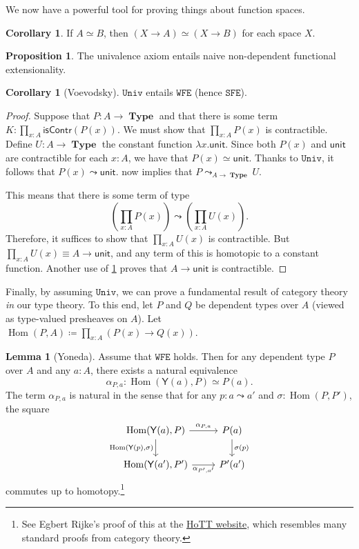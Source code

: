 \documentclass[10pt,letterpaper,cm]{nupset}
\theoremstyle{definition}
\theoremstyle{theorem}
\newtheorem{lemma}[definition]{Lemma}
\newtheorem{prop}[definition]{Proposition}
\newtheorem{corollary}[definition]{Corollary}
\theoremstyle{remark}
\newcommand{\1}{\mathbf{1}}
\newcommand{\wfe}{\mathtt{WFE}}
\newcommand{\sfe}{\mathtt{SFE}}
\newcommand{\univ}{\mathtt{Univ}}
\newcommand{\0}{\vec 0}
\DeclareMathOperator{\Hom}{Hom}
\DeclareMathOperator{\type}{\mathbf{Type}}
\begin{document}
We now have a powerful tool for proving things about function spaces.

\begin{corollary}
If $A \simeq B$, then $\left(X \to A\right) \simeq \left(X \to B\right)$ for each space $X$.
\end{corollary}

\begin{prop}\label{PP}
The univalence axiom entails naive non-dependent functional extensionality. 
\end{prop}

\begin{corollary}[Voevodsky]
$\univ$ entails $\wfe$ (hence $\sfe$).
\end{corollary}
\begin{proof}
Suppose that $P: A \to \type$ and that there is some term $K: \prod_{x:A}\mathsf{isContr}(P(x))$. We must show that $\prod_{x:A} P(x)$ is contractible.  Define $U: A \to \type$ the constant function $\lambda x. \mathsf{unit}$. Since both $P(x)$ and $ \mathsf{unit}$ are contractible for each $x:A$, we have that $P(x) \simeq  \mathsf{unit}$. Thanks to $\univ$, it follows that $P(x) \leadsto  \mathsf{unit}$.   now implies that $P\leadsto_{A \to \type} U$.

\smallskip

 This means that there is some term of type $$  \left(\prod_{x:A} P(x) \right) \leadsto \left(\prod_{x:A} U(x) \right)  .$$ Therefore, it suffices to show that $\prod_{x:A}U(x)$ is contractible.  But $\prod_{x:A}U(x) \equiv A \to \mathsf{unit}$, and any term of this is homotopic to a constant function. Another use of \cref{PP} proves that $A \to \mathsf{unit}$ is contractible. 
\end{proof}

Finally, by assuming $\univ$, we can prove a fundamental result of category theory \emph{in} our type theory. To this end, let $P$ and $Q$ be dependent types over $A$ (viewed as type-valued presheaves on $A$). Let $\Hom(P, A) \coloneqq \prod_{x:A}\left(P(x) \to Q(x)\right)$.


\begin{lemma}[Yoneda]
Assume that $\wfe$ holds. Then for any dependent type $P$ over $A$ and any $a: A$, there exists a natural equivalence $$ \alpha_{P,a} :\Hom(\mathsf{Y}(a), P)\simeq P(a) . $$ The term $ \alpha_{P,a} $ is natural in the sense that for any $p: a\leadsto a'$ and $\sigma : \Hom(P, P')$, the square
\[
\begin{tikzcd}
{\Hom(\mathsf{Y}(a), P)} \arrow[r, "{\alpha_{P,a}}"] \arrow[d, "{\Hom(\mathsf{Y}(p), \sigma)}"'] & P(a) \arrow[d, "\sigma(p)"] \\
{\Hom(\mathsf{Y}(a'), P')} \arrow[r, "{\alpha_{P', a'}}"'] & P'(a')
\end{tikzcd}\] commutes up to homotopy.\footnote{See Egbert Rijke's proof of this at the \href{https://homotopytypetheory.org/2012/05/02/a-type-theoretical-yoneda-lemma/}{HoTT website}, which resembles many standard proofs from category theory.}
\end{lemma}
\end{document}
